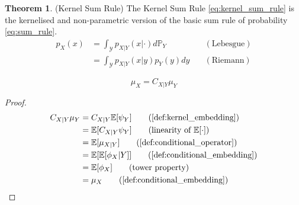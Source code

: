 \documentclass[twoside]{article} \usepackage{aistats2017}
\theoremstyle{definition}
\newtheorem{theorem}{Theorem}[section]
\newcommand{\rv}[1]{{#1}}
\newcommand{\expect}[1]{{\mathbb{E}[#1]}}
\newcommand{\muX}{\mu_{\rv{X}}}
\newcommand{\muY}{\mu_{\rv{Y}}}
\newcommand{\phiX}{\phi_{\rv{X}}}
\newcommand{\psiY}{\psi_{\rv{Y}}}
\newcommand{\Cxly}{C_{\rv{X} | \rv{Y}}}
\begin{document}
		\begin{theorem} \label{thm:kernel_sum_rule}
			(Kernel Sum Rule)
			The Kernel Sum Rule \eqref{eq:kernel_sum_rule} is the kernelised and non-parametric version of the basic sum rule of probability \eqref{eq:sum_rule}.
			\begin{equation}
			\begin{aligned}
				p_{\rv{X}}(x) &= \int_{\mathcal{Y}} p_{\rv{X} | \rv{Y}}(x | \cdot) d\mathbb{P}_{\rv{Y}} \quad & \mathrm{(Lebesgue)} \\
				&= \int_{\mathcal{Y}} p_{\rv{X} | \rv{Y}}(x | y) p_{\rv{Y}}(y)dy \quad & \mathrm{(Riemann)}
			\label{eq:sum_rule}
			\end{aligned}
			\end{equation}
			
			\begin{equation}
				\muX = \Cxly \muY
			\label{eq:kernel_sum_rule}
			\end{equation}
			
			\begin{proof}
				\begin{align*}
				\Cxly \muY &= \Cxly \expect{\psiY} \tag{\cref{def:kernel_embedding}} \\
				&= \expect{\Cxly \psiY} \tag{linearity of $\expect{\cdot}$} \\
				&= \expect{\mu_{\rv{X} | \rv{Y}}} \tag{\cref{def:conditional_operator}} \\
				&= \expect{\expect{\phiX | \rv{Y}}} \tag{\cref{def:conditional_embedding}} \\
				&= \expect{\phiX} \tag{tower property} \\
				&= \muX \tag{\cref{def:conditional_embedding}}
				\end{align*}
			\end{proof}
		\end{theorem}
		
\end{document}
